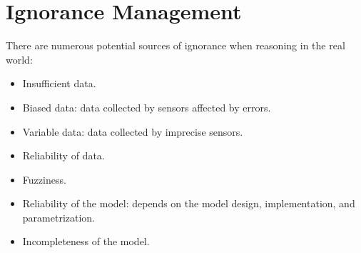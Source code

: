 \documentclass[12pt, a4paper]{report}
\begin{document}
    \section{Ignorance Management}
    There are numerous potential sources of ignorance when reasoning in the real world:
    \begin{itemize}
        \item Insufficient data.
        \item Biased data: data collected by sensors affected by errors.
        \item Variable data: data collected by imprecise sensors.
        \item Reliability of data.
        \item Fuzziness.
        \item Reliability of the model: depends on the model design, implementation, and parametrization.
        \item Incompleteness of the model.
    \end{itemize}
\end{document}
